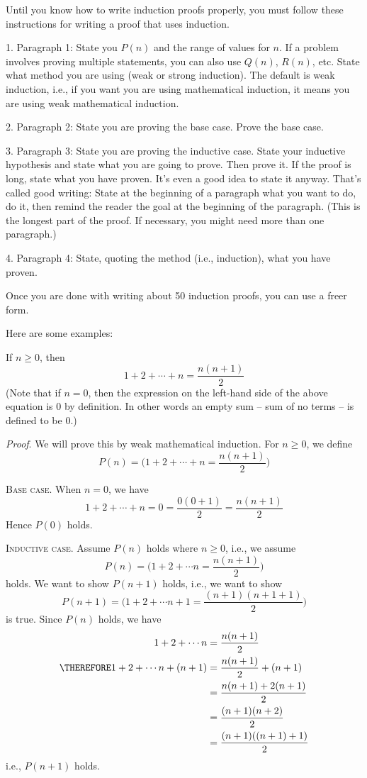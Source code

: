 Until you know how to write induction proofs properly, you must follow these
instructions for writing a proof that uses induction.
\begin{tightlist}
\item[1.]
  Paragraph 1: State you $P(n)$ and the range of values for $n$.
  If a problem involves proving multiple statements, you can also use
  $Q(n)$, $R(n)$, etc.
  State what method you are using (weak or strong induction).
  The default is weak induction, i.e., if you want you are using
  mathematical induction, it means you are using weak mathematical induction.
\item [2.]
  Paragraph 2: State you are proving the base case.
  Prove the base case.
\item [3.]
  Paragraph 3: State you are proving the inductive case.
  State your inductive hypothesis and state what you are going to prove.
  Then prove it. If the proof is long, state what you have proven.
  It's even a good idea to state it anyway. That's called good writing:
  State at the beginning of a paragraph what you want to do, do it, then
  remind the reader the goal at the beginning of the paragraph.
  (This is the longest part of the proof. If necessary, you might need
  more than one paragraph.)
\item [4.]
  Paragraph 4:
  State, quoting the method (i.e., induction), what you have proven.
\end{tightlist}
Once you are done with writing about 50 induction proofs, you can use a
freer form.

Here are some examples:

\newpage

\begin{thm}
  If $n \geq 0$, then
  \[
    1 + 2 + \cdots + n = \frac{n(n + 1)}{2}
  \]
  (Note that if $n = 0$, then the expression on the left-hand side of the above
  equation is 0 by definition.
  In other words an empty sum -- sum of no terms -- is defined to be 0.)
\end{thm}

\textit{Proof}.
We will prove this by weak mathematical induction.
For $n \geq 0$, we define
\[
  P(n) = \biggl( 1 + 2 + \cdots + n = \frac{n(n + 1)}{2} \biggr)
\]

\textsc{Base case.}
When $n = 0$, we have
\[
1 + 2 + \cdots + n = 0 = \frac{0(0 + 1)}{2} = \frac{n (n + 1)}{2}
\]
Hence $P(0)$ holds.

\textsc{Inductive case.}
Assume $P(n)$ holds where $n \geq 0$, i.e., we assume
\[
  P(n) = \biggl( 1 + 2 + \cdots n = \frac{n(n + 1)}{2} \biggr)
\]
holds.
We want to show $P(n + 1)$ holds, i.e., we want to show
\[
P(n + 1) =
\biggl(
1 + 2 + \cdots n + 1 = \frac{(n + 1)(n + 1 + 1)}{2}
\biggr)
\]
is true.
Since $P(n)$ holds, we have
\begin{align*}
  1 + 2 + \cdots n
  &= \frac{n(n + 1)}{2} \\
  \THEREFORE 1 + 2 + \cdots n + (n + 1)
  &= \frac{n(n + 1)}{2} + (n + 1) \\
  &= \frac{n(n + 1) + 2(n + 1)}{2} \\
  &= \frac{(n + 1)(n + 2)}{2} \\
  &= \frac{(n + 1)((n + 1) + 1)}{2}
\end{align*}
i.e., $P(n + 1)$ holds.

